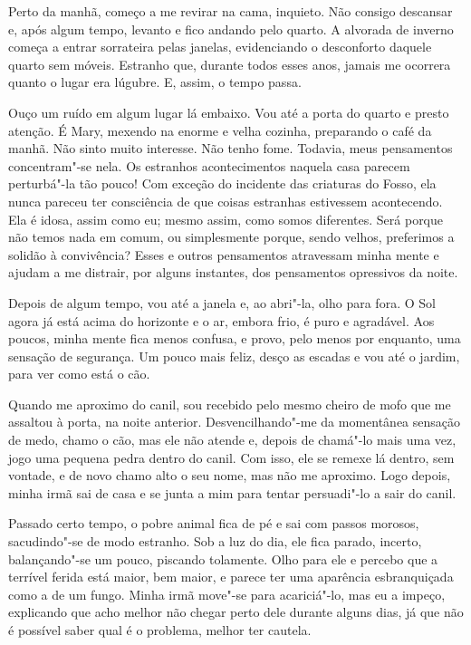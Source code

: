 Perto da manhã, começo a me revirar na cama, inquieto. Não consigo descansar e, após algum tempo, levanto e fico
andando pelo quarto. A alvorada de inverno começa a entrar sorrateira pelas janelas, evidenciando o desconforto daquele
quarto sem móveis. Estranho que, durante todos esses anos, jamais me ocorrera quanto o lugar era lúgubre. E, assim, o
tempo passa. 

Ouço um ruído em algum lugar lá embaixo. Vou até a porta do quarto e presto atenção. É Mary, mexendo na enorme e
velha cozinha, preparando o café da manhã. Não sinto muito interesse. Não tenho fome. Todavia, meus pensamentos
concentram"-se nela. Os estranhos acontecimentos naquela casa parecem perturbá"-la tão pouco! Com exceção do incidente
das criaturas do Fosso, ela nunca pareceu ter consciência de que coisas estranhas estivessem acontecendo. Ela é idosa,
assim como eu; mesmo assim, como somos diferentes. Será porque não temos nada em comum, ou simplesmente porque, sendo
velhos, preferimos a solidão à convivência? Esses e outros pensamentos atravessam minha mente e ajudam a me distrair,
por alguns instantes, dos pensamentos opressivos da noite.

Depois de algum tempo, vou até a janela e, ao abri"-la, olho para fora. O Sol agora já está acima do horizonte e o ar,
embora frio, é puro e agradável. Aos poucos, minha mente fica menos confusa, e provo, pelo menos por enquanto, uma
sensação de segurança. Um pouco mais feliz, desço as escadas e vou até o jardim, para ver como está o cão.

Quando me aproximo do canil, sou recebido pelo mesmo cheiro de mofo que me assaltou à porta, na noite anterior.
Desvencilhando"-me da momentânea sensação de medo, chamo o cão, mas ele não atende e, depois de chamá"-lo mais uma
vez, jogo uma pequena pedra dentro do canil. Com isso, ele se remexe lá dentro, sem vontade, e de novo chamo alto o
seu nome, mas não me aproximo. Logo depois, minha irmã sai de casa e se junta a mim para tentar persuadi"-lo a sair do
canil.

Passado certo tempo, o pobre animal fica de pé e sai com passos morosos, sacudindo"-se de modo estranho. Sob a luz do
dia, ele fica parado, incerto, balançando"-se um pouco, piscando tolamente. Olho para ele e percebo que a terrível ferida
está maior, bem maior, e parece ter uma aparência esbranquiçada como a de um fungo. Minha irmã move"-se para
acariciá"-lo, mas eu a impeço, explicando que acho melhor não chegar perto dele durante alguns dias, já que não é
possível saber qual é o problema, melhor ter cautela.

